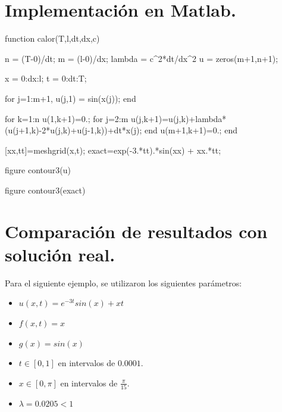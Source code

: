 \documentclass[12pt,letterpaper]{article}
\begin{document}
\section{Implementación en Matlab.}

\begin{verbatimtab}
function calor(T,l,dt,dx,c)

    n      = (T-0)/dt;
    m      = (l-0)/dx;
    lambda = c^2*dt/dx^2        %
    u      = zeros(m+1,n+1);

    x = 0:dx:l;
    t = 0:dt:T;

    for j=1:m+1,
        u(j,1) = sin(x(j));     %
    end

    for k=1:n
        u(1,k+1)=0.;            %
        for j=2:m
            u(j,k+1)=u(j,k)+lambda*(u(j+1,k)-2*u(j,k)+u(j-1,k))+dt*x(j);
        end
        u(m+1,k+1)=0.;          %
    end

    [xx,tt]=meshgrid(x,t);
    exact=exp(-3.*tt).*sin(xx) + xx.*tt;
    
    figure
    contour3(u)
    
    figure
    contour3(exact)
\end{verbatimtab}


\section{Comparación de resultados con solución real.}
Para el siguiente ejemplo, se utilizaron los siguientes parámetros:
\begin{itemize}
	\item $u(x,t) = e^{-3t}sin(x) + xt$
	\item $f(x,t) = x$
	\item $g(x) = sin(x)$
	\item $t \in [0,1]$ en intervalos de $0.0001$.
	\item $x \in [0,\pi]$ en intervalos de $\frac{\pi}{15}$.
	\item $\lambda = 0.0205 < 1$
\end{itemize}
\end{document}
